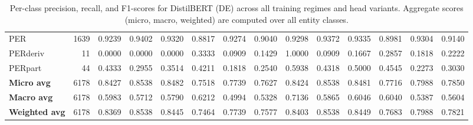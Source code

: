\documentclass[11pt,a4paper,twocolumn]{article}
\begin{document}
\begin{table}[t]
\begin{tabular}{l r ccc ccc ccc ccc}
PER      & 1639 & 0.9239 & 0.9402 & 0.9320 & 0.8817 & 0.9274 & 0.9040 & 0.9298 & 0.9372 & 0.9335 & 0.8981 & 0.9304 & 0.9140 \\
PERderiv &   11 & 0.0000 & 0.0000 & 0.0000 & 0.3333 & 0.0909 & 0.1429 & 1.0000 & 0.0909 & 0.1667 & 0.2857 & 0.1818 & 0.2222 \\
PERpart  &   44 & 0.4333 & 0.2955 & 0.3514 & 0.4211 & 0.1818 & 0.2540 & 0.5938 & 0.4318 & 0.5000 & 0.4545 & 0.2273 & 0.3030 \\
\midrule
\textbf{Micro avg}    & 6178 & 0.8427 & 0.8538 & 0.8482 & 0.7518 & 0.7739 & 0.7627 & 0.8424 & 0.8538 & 0.8481 & 0.7716 & 0.7988 & 0.7850 \\
\textbf{Macro avg}    & 6178 & 0.5983 & 0.5712 & 0.5790 & 0.6212 & 0.4994 & 0.5328 & 0.7136 & 0.5865 & 0.6046 & 0.6040 & 0.5387 & 0.5604 \\
\textbf{Weighted avg} & 6178 & 0.8369 & 0.8538 & 0.8445 & 0.7464 & 0.7739 & 0.7577 & 0.8403 & 0.8538 & 0.8449 & 0.7683 & 0.7988 & 0.7821 \\
\bottomrule
\end{tabular}
\caption{Per-class precision, recall, and F1-scores for DistilBERT (DE) across all training regimes and head variants. Aggregate scores (micro, macro, weighted) are computed over all entity classes.}
\label{tab:appendix-distilbert-de-classification}
\end{table}
\end{document}
